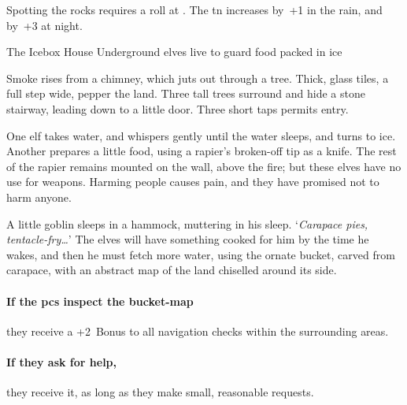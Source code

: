\begin{multicols}{2}
Spotting the rocks requires a  roll at \tn[12].
The \gls{tn} increases by~+1 in the rain, and by~+3 at night.

{The Icebox House}%
{Underground elves live to guard food packed in ice}%


Smoke rises from a chimney, which juts out through a tree.
Thick, glass tiles, a full step wide, pepper the land.
Three tall trees surround and hide a stone stairway, leading down to a little door.
Three short taps permits entry.

One elf takes water, and whispers gently until the water sleeps, and turns to ice.
Another prepares a little food, using a rapier's broken-off tip as a knife.
The rest of the rapier remains mounted on the wall, above the fire; but these elves have no use for weapons.
Harming people causes pain, and they have promised not to harm anyone.

A little goblin sleeps in a hammock, muttering in his sleep.
`\textit{Carapace pies, tentacle-fry\ldots}'
The elves will have something cooked for him by the time he wakes, and then he must fetch more water, using the ornate bucket, carved from carapace, with an abstract map of the land chiselled around its side.

\elf

\paragraph{If the \glspl{pc} inspect the bucket-map}
they receive a +2~Bonus to all \gls{navigation} checks within the surrounding \glspl{area}.

\paragraph{If they ask for help,}
they receive it, as long as they make small, reasonable requests.


\end{multicols}
